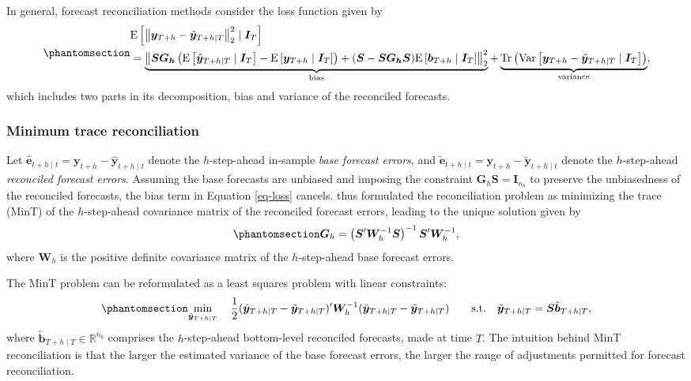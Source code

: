 \documentclass[
  11pt]{article}
\theoremstyle{plain}
\theoremstyle{remark}
\begin{document}
In general, forecast reconciliation methods consider the loss function
\citep{Ben_Taieb2019-be} given by
\begin{equation}\phantomsection\label{eq-loss}{
\begin{aligned}
& \mathrm{E}\left[\left\|\bm{y}_{T+h}-\tilde{\bm{y}}_{T+h \mid T}\right\|_2^2 \mid \bm{I}_T\right] \\
& =\underbrace{\left\|\bm{S G_h}\left(\mathrm{E}\left[\hat{\bm{y}}_{T+h \mid T} \mid \bm{I}_T\right]-\mathrm{E}\left[\bm{y}_{T+h} \mid \bm{I}_T\right]\right)+(\bm{S}-\bm{S G_h S}) \mathrm{E}\left[\bm{b}_{T+h} \mid \bm{I}_T\right]\right\|_2^2}_{\text{bias}} +\underbrace{\operatorname{Tr}\left(\operatorname{Var}\left[\bm{y}_{T+h}-\tilde{\bm{y}}_{T+h \mid T} \mid \bm{I}_T\right]\right)}_{\text{variance}},
\end{aligned}
}\end{equation} which includes two parts in its decomposition, bias and
variance of the reconciled forecasts.

\subsubsection*{Minimum trace
reconciliation}\label{minimum-trace-reconciliation}

Let
\(\hat{\bm{e}}_{t+h \mid t} = \bm{y}_{t+h} - \hat{\bm{y}}_{t+h \mid t}\)
denote the \(h\)-step-ahead in-sample \emph{base forecast errors}, and
\(\tilde{\bm{e}}_{t+h \mid t} = \bm{y}_{t+h} - \tilde{\bm{y}}_{t+h \mid t}\)
denote the \(h\)-step-ahead \emph{reconciled forecast errors}. Assuming
the base forecasts are unbiased and imposing the constraint
\(\bm{G}_h\bm{ S}=\bm{I}_{n_b}\) to preserve the unbiasedness of the
reconciled forecasts, the bias term in Equation \eqref{eq-loss} cancels.
\citet{Wickramasuriya2019-fc} thus formulated the reconciliation problem
as minimizing the trace (MinT) of the \(h\)-step-ahead covariance matrix
of the reconciled forecast errors, leading to the unique solution given
by \begin{equation}\phantomsection\label{eq-mint}{
\bm{G}_h=\left(\bm{S}^{\prime} \bm{W}_h^{-1} \bm{S}\right)^{-1} \bm{S}^{\prime} \bm{W}_h^{-1},
}\end{equation} where \(\bm{W}_h\) is the positive definite covariance
matrix of the \(h\)-step-ahead base forecast errors.

The MinT problem can be reformulated as a least squares problem with
linear constraints: \begin{equation}\phantomsection\label{eq-mint_op}{
\min_{\tilde{\bm{y}}_{T+h \mid T}} \quad \frac{1}{2}(\hat{\bm{y}}_{T+h \mid T}-\tilde{\bm{y}}_{T+h \mid T})^{\prime} \bm{W}_{h}^{-1}(\hat{\bm{y}}_{T+h \mid T}-\tilde{\bm{y}}_{T+h \mid T})
 \qquad \text{s.t.} \quad \tilde{\bm{y}}_{T+h \mid T}=\bm{S}\tilde{\bm{b}}_{T+h \mid T},
}\end{equation} where
\(\tilde{\bm{b}}_{T+h \mid T} \in \mathbb{R}^{n_b}\) comprises the
\(h\)-step-ahead bottom-level reconciled forecasts, made at time \(T\).
The intuition behind MinT reconciliation is that the larger the
estimated variance of the base forecast errors, the larger the range of
adjustments permitted for forecast reconciliation.
\end{document}
